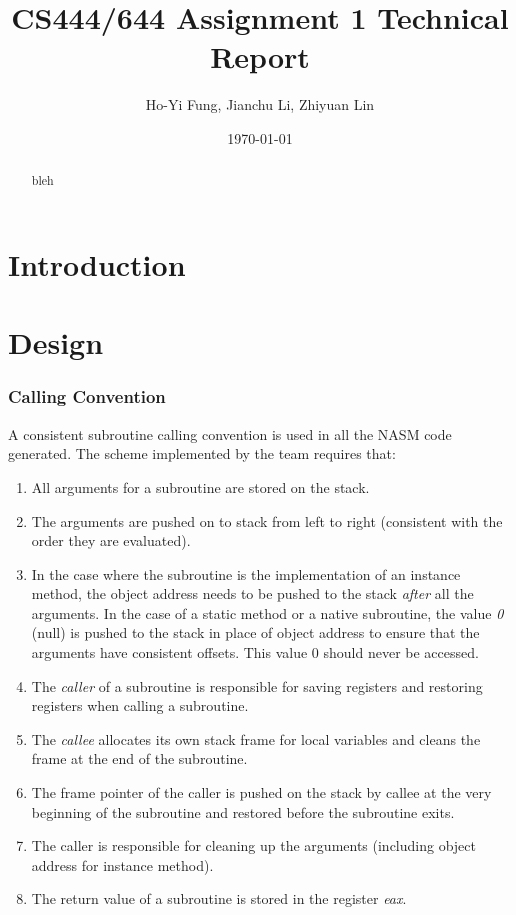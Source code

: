 \documentclass[a4paper, notitlepage]{report}
\title{CS444/644 Assignment 1 Technical Report}
\author{Ho-Yi Fung, Jianchu Li, Zhiyuan Lin}
\date{\today}
\begin{document}
{\let\newpage\relax\maketitle}

\vspace{30pt}
\begin{abstract}
bleh
\end{abstract}


\tableofcontents

\newpage

\chapter{Introduction}



\chapter{Design}
\label{design}


\subsection{Calling Convention}
\label{calling}

A consistent subroutine calling convention is used in all the NASM code generated. The scheme implemented by the team requires that:
\begin{enumerate}
\item All arguments for a subroutine are stored on the stack.
\item The arguments are pushed on to stack from left to right (consistent with the order they are evaluated).
\item In the case where the subroutine is the implementation of an instance method, the object address needs to be pushed to the stack \emph{after} all the arguments. In the case of a static method or a native subroutine, the value \emph{0} (null) is pushed to the stack in place of object address to ensure that the arguments have consistent offsets. This value 0 should never be accessed.
\item The \emph{caller} of a subroutine is responsible for saving registers and restoring registers when calling a subroutine.
\item The \emph{callee} allocates its own stack frame for local variables and cleans the frame at the end of the subroutine.
\item The frame pointer of the caller is pushed on the stack by callee at the very beginning of the subroutine and restored before the subroutine exits. 
\item The caller is responsible for cleaning up the arguments (including object address for instance method).
\item The return value of a subroutine is stored in the register \emph{eax}.
\end{enumerate}
\end{document}
